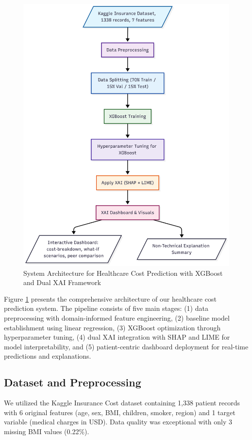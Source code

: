 \documentclass[conference]{IEEEtran}
\begin{document}
\begin{figure}[htbp]
\centerline{\includegraphics[width=\columnwidth]{paper/XGBoost_XAI_Architecture.png}}
\caption{System Architecture for Healthcare Cost Prediction with XGBoost and Dual XAI Framework}
\label{fig:architecture}
\end{figure}

Figure \ref{fig:architecture} presents the comprehensive architecture of our healthcare cost prediction system. The pipeline consists of five main stages: (1) data preprocessing with domain-informed feature engineering, (2) baseline model establishment using linear regression, (3) XGBoost optimization through hyperparameter tuning, (4) dual XAI integration with SHAP and LIME for model interpretability, and (5) patient-centric dashboard deployment for real-time predictions and explanations.

\subsection{Dataset and Preprocessing}
We utilized the Kaggle Insurance Cost dataset containing 1,338 patient records with 6 original features (age, sex, BMI, children, smoker, region) and 1 target variable (medical charges in USD). Data quality was exceptional with only 3 missing BMI values (0.22\%).
\end{document}
